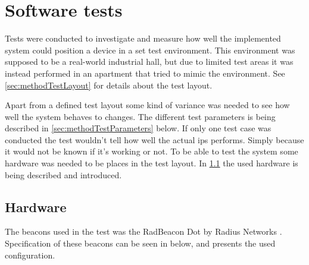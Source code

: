 \section{Software tests}\label{sec:methodSoftwareTests}




Tests were conducted to investigate and measure how well the implemented system could position a device in a set test environment.
This environment was supposed to be a real-world industrial hall, but due to limited test areas it was instead performed in an apartment that tried to mimic the environment.
See \cref{sec:methodTestLayout} for details about the test layout.

\bigskip

Apart from a defined test layout some kind of variance was needed to see how well the system behaves to changes. The different test parameters is being described in \cref{sec:methodTestParameters} below.
If only one test case was conducted the test wouldn't tell how well the actual \acrshort{ips} performs.
Simply because it would not be known if it's working or not.
To be able to test the system some hardware was needed to be places in the test layout. In \cref{sec:methodTestHardware} the used hardware is being described and introduced.


\subsection{Hardware}\label{sec:methodTestHardware}
The beacons used in the test was the RadBeacon Dot by Radius Networks \cite{RadBeaconDotDatasheet}.
Specification of these beacons can be seen in  below, and  presents the used configuration.

